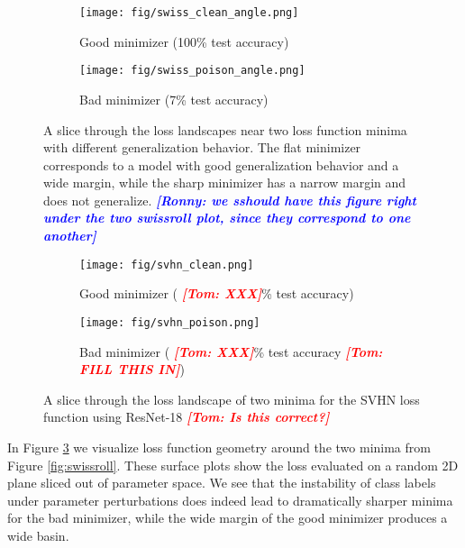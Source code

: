 \documentclass{article}
\newcommand{\tom}[1]{{  \textcolor{red}{\bf \em [Tom: #1]}}}
\newcommand{\ronny}[1]{{  \textcolor{blue}{\bf \em [Ronny: #1]}}}
\begin{document}
 \begin{figure}[t!]
        \centering
        \begin{subfigure}{.49\textwidth}
            \centering
            \texttt{[image: fig/swiss\_clean\_angle.png]}
            \caption{\small Good minimizer (100\% test accuracy)}
            \label{fig:surfaceflat}
        \end{subfigure}
        \begin{subfigure}{.49\textwidth}
            \centering
            \texttt{[image: fig/swiss\_poison\_angle.png]}
            \caption{\small Bad minimizer (7\% test accuracy)}
            \label{fig:surfacesharp}
        \end{subfigure}
        \caption{\small A slice through the loss landscapes near two loss function minima with different generalization behavior.  The flat minimizer corresponds to a model with good generalization behavior and a wide margin, while the sharp minimizer has a narrow margin and does not generalize. \ronny{we sshould have this figure right under the two swissroll plot, since they correspond to one another}}
        \label{fig:sharpflat}
    \end{figure}

 \begin{figure}[t!]
        \centering
        \begin{subfigure}{.49\textwidth}
            \centering
            \texttt{[image: fig/svhn\_clean.png]}
            \caption{\small Good minimizer (\tom{XXX}\% test accuracy)}
            \label{fig:surfaceflat}
        \end{subfigure}
        \begin{subfigure}{.49\textwidth}
            \centering
            \texttt{[image: fig/svhn\_poison.png]}
            \caption{\small Bad minimizer (\tom{XXX}\% test accuracy\tom{FILL THIS IN})}
            \label{fig:surfacesharp}
        \end{subfigure}
        \caption{\small A slice through the loss landscape of two minima for the SVHN loss function using ResNet-18 \tom{Is this correct?}}
        \label{fig:sharpsvhn}
    \end{figure}


In Figure \ref{fig:sharpflat} we visualize loss function geometry around the two minima from Figure \ref{fig:swissroll}.  These surface plots show the loss evaluated on a random 2D plane sliced out of parameter space.   We see that the instability of class labels under parameter perturbations does indeed lead to dramatically sharper minima for the bad minimizer, while the wide margin of the good minimizer produces a wide basin.
\end{document}

